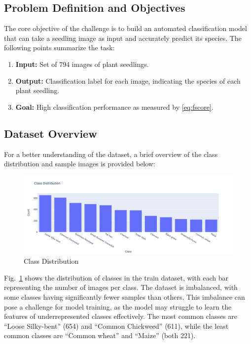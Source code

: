 \subsection{Problem Definition and Objectives}
The core objective of the challenge is to build an automated classification model that can take a seedling image as input and accurately predict its species. The following points summarize the task:

\begin{enumerate}
    \item \textbf{Input:} Set of 794 images of plant seedlings.
    \item \textbf{Output:} Classification label for each image, indicating the species of each plant seedling.
    \item \textbf{Goal:} High classification performance as measured by \ref{eq:fscore}.
\end{enumerate}

\subsection{Dataset Overview}
For a better understanding of the dataset, a brief overview of the class distribution and sample images is provided below:

\begin{figure}[htbp]
    \centerline{\includegraphics[width=0.9\linewidth]{../../resources/class_distribution.png}}
    \caption{Class Distribution}
    \label{fig:class-distribution}
\end{figure}

Fig.~\ref{fig:class-distribution} shows the distribution of classes in the train dataset, with each bar representing the number of images per class. The dataset is imbalanced, with some classes having significantly fewer samples than others. This imbalance can pose a challenge for model training, as the model may struggle to learn the features of underrepresented classes effectively. The most common classes are ``Loose Silky-bent'' (654) and ``Common Chickweed'' (611), while the least common classes are ``Common wheat'' and ``Maize'' (both 221).

